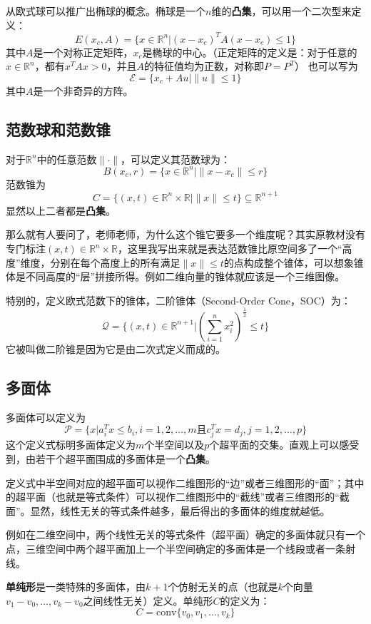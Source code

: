 \documentclass[12pt,a4paper]{book}
\begin{document}
从欧式球可以推广出椭球的概念。椭球是一个$n$维的\textbf{凸集}，可以用一个二次型来定义：
$$E(x_c, A) = \{x \in \mathbb{R}^n | (x - x_c)^TA(x - x_c) \leq 1\}$$
其中$A$是一个对称正定矩阵，$x_c$是椭球的中心。（正定矩阵的定义是：对于任意的$x \in \mathbb{R}^n$，都有$x^TAx > 0$，并且$A$的特征值均为正数，对称即$P=P^T$）
也可以写为
$$\mathcal{E} = \{x_c+Au|\|u\|\leq 1\}$$
其中$A$是一个非奇异的方阵。

\subsection{范数球和范数锥}

对于$\mathbb{R}^n$中的任意范数$\|\cdot\|$，可以定义其范数球为：
$$B(x_c,r) = \{x \in \mathbb{R}^n| \|x-x_c\|\leq r\}$$
范数锥为
$$C=\{(x,t)\in \mathbb{R}^n \times \mathbb{R}|\|x\|\leq t\}\subseteq \mathbb{R}^{n+1}$$
显然以上二者都是\textbf{凸集}。

那么就有人要问了，老师老师，为什么这个锥它要多一个维度呢？其实原教材没有专门标注$(x,t)\in \mathbb{R}^n \times \mathbb{R}$，这里我写出来就是表达范数锥比原空间多了一个“高度”维度，分别在每个高度上的所有满足$\|x\|\leq t$的点构成整个锥体，可以想象锥体是不同高度的“层”拼接所得。例如二维向量的锥体就应该是一个三维图像。

特别的，定义欧式范数下的锥体，二阶锥体（Second-Order Cone，SOC）为：
$$\mathcal{Q} = \{(x,t) \in \mathbb{R}^{n+1} | (\sum_{i=1}^n x_i^2)^{\frac{1}{2}}\leq t\}$$
它被叫做二阶锥是因为它是由二次式定义而成的。

\subsection{多面体}

多面体可以定义为
$$\mathcal{P} = \{x|a_i^Tx\leq b_i, i=1,2,\ldots,m \text{且} c_j^Tx=d_j, j=1,2,\ldots,p \}$$
这个定义式标明多面体定义为$m$个半空间以及$p$个超平面的交集。直观上可以感受到，由若干个超平面围成的多面体是一个\textbf{凸集}。

定义式中半空间对应的超平面可以视作二维图形的“边”或者三维图形的“面”；其中的超平面（也就是等式条件）可以视作二维图形中的“截线”或者三维图形的“截面”。显然，线性无关的等式条件越多，最后得出的多面体的维度就越低。

例如在二维空间中，两个线性无关的等式条件（超平面）确定的多面体就只有一个点，三维空间中两个超平面加上一个半空间确定的多面体是一个线段或者一条射线。

\textbf{单纯形}是一类特殊的多面体，由$k+1$个仿射无关的点（也就是$k$个向量$v_1-v_0,\ldots,v_k-v_0$之间线性无关）定义。单纯形$C$的定义为：
$$C = \text{conv}\{v_0,v_1,\ldots,v_k\}$$
\end{document}
